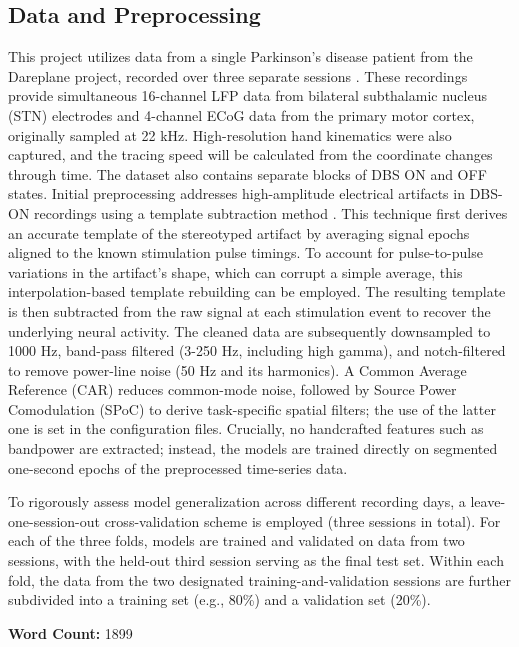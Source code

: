 \documentclass[12pt, a4paper]{article}
\begin{document}
\subsection{Data and Preprocessing}
This project utilizes data from a single Parkinson's disease patient from the Dareplane project, recorded over three separate sessions \parencite{doldLFPECoGData2024}. These recordings provide simultaneous 16-channel LFP data from bilateral subthalamic nucleus (STN) electrodes and 4-channel ECoG data from the primary motor cortex, originally sampled at 22 kHz. High-resolution hand kinematics were also captured, and the tracing speed will be calculated from the coordinate changes through time. The dataset also contains separate blocks of DBS ON and OFF states. Initial preprocessing addresses high-amplitude electrical artifacts in DBS-ON recordings using a template subtraction method \parencite{qianMethodRemovalDeep2017,hammerArtifactCharacterizationMultipurpose2022}. This technique first derives an accurate template of the stereotyped artifact by averaging signal epochs aligned to the known stimulation pulse timings. To account for pulse-to-pulse variations in the artifact's shape, which can corrupt a simple average, this interpolation-based template rebuilding can be employed. The resulting template is then subtracted from the raw signal at each stimulation event to recover the underlying neural activity. The cleaned data are subsequently downsampled to 1000 Hz, band-pass filtered (3-250 Hz, including high gamma), and notch-filtered to remove power-line noise (50 Hz and its harmonics). A Common Average Reference (CAR) reduces common-mode noise, followed by Source Power Comodulation (SPoC) to derive task-specific spatial filters; the use of the latter one is set in the configuration files. Crucially, no handcrafted features such as bandpower are extracted; instead, the models are trained directly on segmented one-second epochs of the preprocessed time-series data.

To rigorously assess model generalization across different recording days, a leave-one-session-out cross-validation scheme is employed (three sessions in total). For each of the three folds, models are trained and validated on data from two sessions, with the held-out third session serving as the final test set. Within each fold, the data from the two designated training-and-validation sessions are further subdivided into a training set (e.g., 80\%) and a validation set (20\%).

\vspace{1em}
\noindent\textbf{Word Count:} 1899
\newpage
\end{document}
